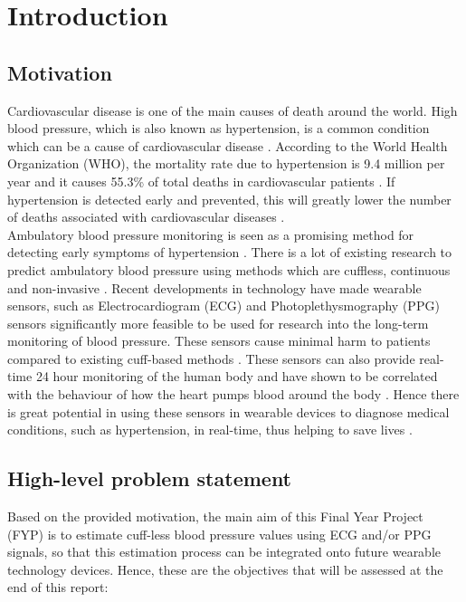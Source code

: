 \section{Introduction}

\subsection{Motivation}
Cardiovascular disease is one of the main causes of death around the world. 
High blood pressure, which is also known as hypertension, is a common 
condition which can be a cause of cardiovascular disease \cite{Sharma2017}. 
According to the World Health Organization (WHO), the mortality rate due 
to hypertension is 9.4 million per year and it causes 55.3\%  of  total  
deaths  in  cardiovascular patients \cite{Janjua2017}. If hypertension is 
detected early and prevented, this will greatly lower the number of deaths 
associated with cardiovascular 
diseases \cite{Janjua2017}. \\ \newline \noindent Ambulatory blood pressure monitoring 
is seen as a promising method for detecting early symptoms of 
hypertension \cite{Kario2021}. There is a lot of existing research to 
predict ambulatory blood pressure using methods which are cuffless, continuous 
and non-invasive \cite{Zaki2018}. Recent developments in 
technology have made wearable sensors, such as Electrocardiogram (ECG) and 
Photoplethysmography (PPG) sensors significantly more feasible to be used 
for research into the long-term monitoring of blood pressure. These sensors cause minimal 
harm to patients compared to existing cuff-based 
methods \cite{Malikeh2019} \cite{Bard2019}. These sensors can also provide real-time 24 hour monitoring of the human 
body and have shown to be correlated with the behaviour of how the heart 
pumps blood around the body \cite{Bard2019}. Hence there is great potential in using these sensors in wearable devices to 
diagnose medical conditions, such as hypertension, in real-time, thus 
helping to save lives \cite{Simjanoska20182}. 

\subsection{High-level problem statement}
Based on the provided motivation, the main aim of this Final Year Project (FYP) is to estimate 
cuff-less blood pressure values using ECG and/or PPG signals, so that this estimation process 
can be integrated onto future wearable technology devices. Hence, these are the objectives that will be assessed at the end of this report:

